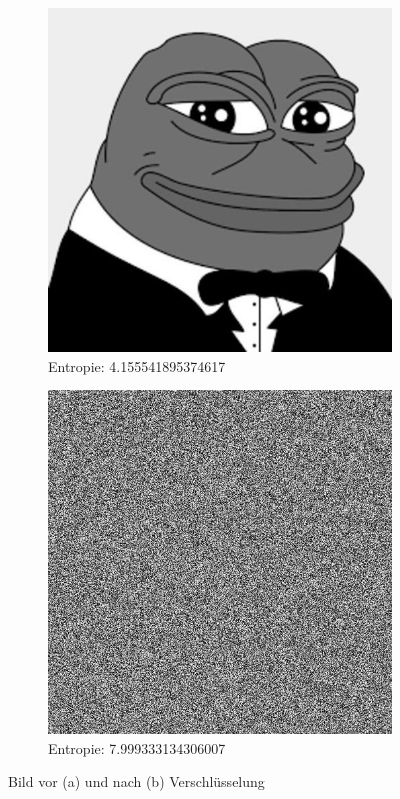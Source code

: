 \begin{figure}
	\centering

	\begin{subfigure}{0.35\textwidth}
		\includegraphics[width=\textwidth]{../1/3/gray_4.1555418953746175_frog.jpg}
		\caption{Entropie: 4.155541895374617}
	\end{subfigure}
	\hfill
	\begin{subfigure}{0.35\textwidth}
		\includegraphics[width=\textwidth]{../1/3/encrypted_7.999333134306007_frog.jpg}
		\caption{Entropie: 7.999333134306007}
	\end{subfigure}

	\caption{Bild vor (a) und nach (b) Verschlüsselung}
	\label{fig:frog}
\end{figure}

